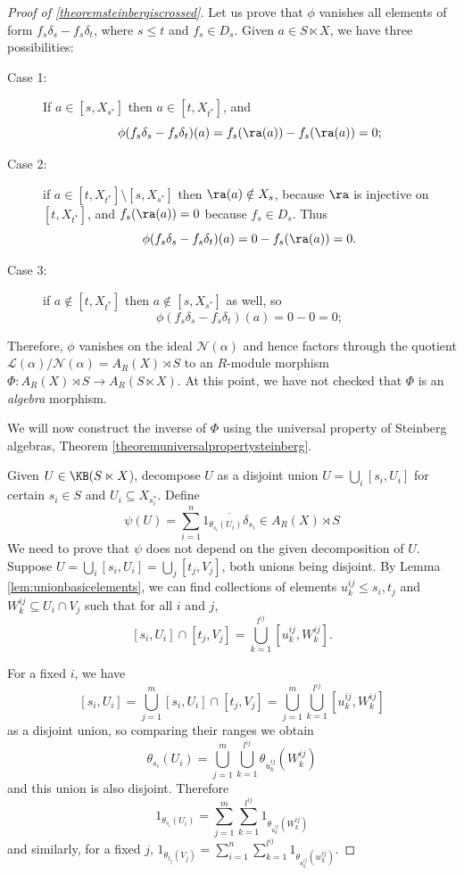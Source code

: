 \begin{proof}[Proof of \ref{theoremsteinbergiscrossed}]
%
Let us prove that $\phi$ vanishes all elements of form $f_s\delta_s - f_s\delta_t$, where $s \leq t$ and $f_s \in D_s$. Given $a \in S \ltimes X$, we have three possibilities:
\begin{description}
\item[Case 1:] If $a \in [s, X_{s^*}]$ then $a \in [t,X_{t^*}]$, and 
\[\phi(f_s\delta_s-f_s\delta_t)(a)=f_s(\ra(a))-f_s(\ra(a))=0;\]
\item[Case 2:] if $a \in [t,X_{t^*}]\setminus [s,X_{s^*}]$ then $\ra(a) \notin X_s$, because $\ra$ is injective on $[t,X_{t^*}]$, and $f_s(\ra(a))=0$ because $f_s \in D_s$. Thus 
\[\phi(f_s\delta_s-f_s\delta_t)(a)=0-f_s(\ra(a))=0.\]
\item[Case 3:] if $a \notin [t,X_{t^*}]$ then $a \notin [s,X_{s^*}]$ as well, so
\[\phi(f_s\delta_s-f_s\delta_t)(a)=0-0=0;\]
\end{description}

Therefore, $\phi$ vanishes on the ideal $\mathscr{N}(\alpha)$ and hence factors through the quotient $\mathscr{L}(\alpha)/\mathscr{N}(\alpha)=A_R(X)\rtimes S$ to an $R$-module morphism $\Phi:A_R(X)\rtimes S\to A_R(S\ltimes X)$. At this point, we have not checked that $\Phi$ is an \emph{algebra} morphism.

We will now construct the inverse of $\Phi$ using the universal property of Steinberg algebras, Theorem \ref{theoremuniversalpropertysteinberg}.

Given $U\in\KB(S\ltimes X$), decompose $U$ as a disjoint union $U=\bigcup_i[s_i,U_i]$ for certain $s_i\in S$ and $U_i\subseteq X_{s_i^*}$. Define
\[\psi(U)=\sum_{i=1}^n\overline{1_{\theta_{s_i}(U_i)}\delta_{s_i}}\in A_R(X)\rtimes S\]
We need to prove that $\psi$ does not depend on the given decomposition of $U$. Suppose $U=\bigcup_i[s_i,U_i]=\bigcup_j[t_j,V_j]$, both unions being disjoint. By Lemma \ref{lem:unionbasicelements}, we can find collections of elements $u^{ij}_k\leq s_i,t_j$ and $W^{ij}_k\subseteq U_i\cap V_j$ such that for all $i$ and $j$,
\[[s_i,U_i]\cap[t_j,V_j]=\bigcup_{k=1}^{l^{ij}}[u_k^{ij},W_k^{ij}].\]

For a fixed $i$, we have
\[[s_i,U_i]=\bigcup_{j=1}^m[s_i,U_i]\cap[t_j,V_j]=\bigcup_{j=1}^m\bigcup_{k=1}^{l^{ij}}[u_k^{ij},W^{ij}_k]\]
as a disjoint union, so comparing their ranges we obtain
\[\theta_{s_i}(U_i)=\bigcup_{j=1}^m\bigcup_{k=1}^{l^{ij}}\theta_{u_k^{ij}}(W_k^{ij})\]
and this union is also disjoint. Therefore
\[1_{\theta_{s_i}(U_i)}=\sum_{j=1}^m\sum_{k=1}^{l^{ij}}1_{\theta_{u_k^{ij}}(W_k^{ij})}\]
and similarly, for a fixed $j$, $1_{\theta_{t_j}(V_j)}=\sum_{i=1}^n\sum_{k=1}^{l^{ij}}1_{\theta_{u_k^{ij}}(w_k^{ij})}$.


\end{proof}
